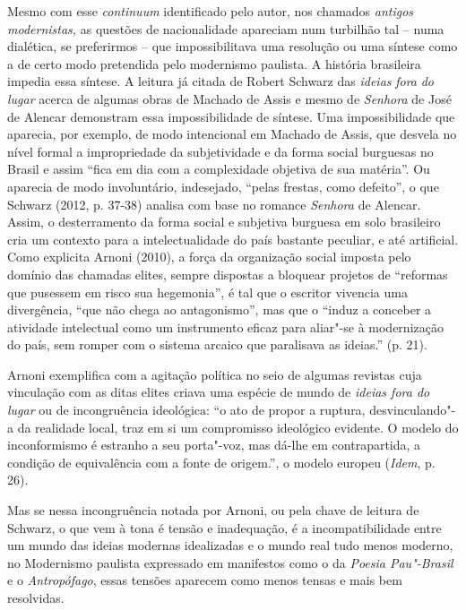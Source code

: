 {Mesmo com esse \emph{continuum} identificado pelo autor, nos chamados
\emph{antigos modernistas,} as questões de nacionalidade apareciam num
turbilhão tal -- numa dialética, se preferirmos -- que impossibilitava
uma resolução ou uma síntese como a de certo modo pretendida pelo
modernismo paulista. A história brasileira impedia essa síntese. A
leitura já citada de Robert Schwarz das \emph{ideias} \emph{fora}
\emph{do} \emph{lugar} acerca de algumas obras de Machado de Assis e
mesmo de \emph{Senhora} de José de Alencar demonstram essa
impossibilidade de síntese. Uma impossibilidade que aparecia, por
exemplo, de modo intencional em Machado de Assis, que desvela no nível
formal a impropriedade da subjetividade e da forma social burguesas no
Brasil e assim ``fica em dia com a complexidade objetiva de sua
matéria''. Ou aparecia de modo involuntário, indesejado, ``pelas
frestas, como defeito'', o que Schwarz (2012, p. 37-38) analisa com base
no romance \emph{Senhora} de Alencar. Assim, o desterramento da forma
social e subjetiva burguesa em solo brasileiro cria um contexto para a
intelectualidade do país bastante peculiar, e até artificial. Como
explicita Arnoni (2010), a força da organização social imposta pelo
domínio das chamadas elites, sempre dispostas a bloquear projetos de
``reformas que pusessem em risco sua hegemonia'', é tal que o escritor
vivencia uma divergência, ``que não chega ao antagonismo'', mas que o
``induz a conceber a atividade intelectual como um instrumento eficaz
para aliar"-se à modernização do país, sem romper com o sistema arcaico
que paralisava as ideias.'' (p. 21).

Arnoni exemplifica com a agitação política no seio de algumas revistas
cuja vinculação com as ditas elites criava uma espécie de mundo de
\emph{ideias fora do lugar} ou de incongruência ideológica: ``o ato de
propor a ruptura, desvinculando"-a da realidade local, traz em si um
compromisso ideológico evidente. O modelo do inconformismo é estranho a
seu porta"-voz, mas dá-lhe em contrapartida, a condição de equivalência
com a fonte de origem.'', o modelo europeu (\emph{Idem}, p. 26).

Mas se nessa incongruência notada por Arnoni, ou pela chave de leitura
de Schwarz, o que vem à tona é tensão e inadequação, é a
incompatibilidade entre um mundo das ideias modernas idealizadas e o
mundo real tudo menos moderno, no Modernismo paulista expressado em
manifestos como o da \emph{Poesia Pau"-Brasil} e o \emph{Antropófago},
essas tensões aparecem como menos tensas e mais bem resolvidas.

}
